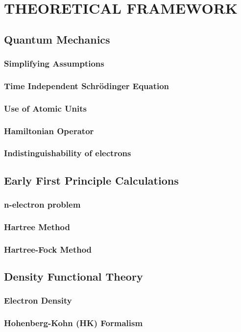 \chapter{THEORETICAL FRAMEWORK}
\section{Quantum Mechanics}
    \subsection{Simplifying Assumptions}
    \subsection{Time Independent Schr{\"o}dinger Equation}
    \subsection{Use of Atomic Units}
    \subsection{Hamiltonian Operator}
\subsection{Indistinguishability of electrons}
\section{Early First Principle Calculations}
    \subsection{n-electron problem}
    \subsection{Hartree Method}
    \subsection{Hartree-Fock Method}
\section{Density Functional Theory}
    \subsection{Electron Density}
    \subsection{Hohenberg-Kohn (HK) Formalism}
